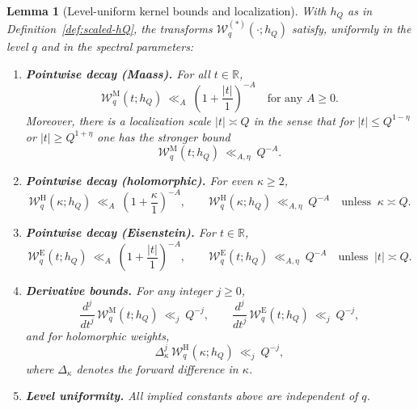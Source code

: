 \documentclass[11pt]{article}
\newtheorem{lemma}{Lemma}[part]
\theoremstyle{definition}
\theoremstyle{remark}
\numberwithin{equation}{part}
\begin{document}
\begin{lemma}[Level-uniform kernel bounds and localization]\label{lem:kuznetsov-uniform}
	With $h_Q$ as in Definition~\ref{def:scaled-hQ}, the transforms $\mathcal W_q^{(*)}(\cdot;h_Q)$ satisfy, uniformly in the level $q$ and in the spectral parameters:
	\begin{enumerate}[label=(\alph*), leftmargin=2em]
		\item \textbf{Pointwise decay (Maass).} For all $t\in\mathbb R$,
		      \[
			      \mathcal W_q^{\mathrm{M}}(t;h_Q)\ \ll_A\ \left(1+\frac{|t|}{1}\right)^{-A}
			      \quad\text{for any }A\ge0.
		      \]
		      Moreover, there is a \emph{localization scale} $|t|\asymp Q$ in the sense that for $|t|\le Q^{1-\eta}$ or $|t|\ge Q^{1+\eta}$ one has the stronger bound
		      \[
			      \mathcal W_q^{\mathrm{M}}(t;h_Q)\ \ll_{A,\eta}\ Q^{-A}.
		      \]
		\item \textbf{Pointwise decay (holomorphic).} For even $\kappa\ge2$,
		      \[
			      \mathcal W_q^{\mathrm{H}}(\kappa;h_Q)\ \ll_A\ \left(1+\frac{\kappa}{1}\right)^{-A},
			      \qquad
			      \mathcal W_q^{\mathrm{H}}(\kappa;h_Q)\ \ll_{A,\eta}\ Q^{-A}\quad\text{unless }\ \kappa\asymp Q.
		      \]
		\item \textbf{Pointwise decay (Eisenstein).} For $t\in\mathbb R$,
		      \[
			      \mathcal W_q^{\mathrm{E}}(t;h_Q)\ \ll_A\ \left(1+\frac{|t|}{1}\right)^{-A},
			      \qquad
			      \mathcal W_q^{\mathrm{E}}(t;h_Q)\ \ll_{A,\eta}\ Q^{-A}\quad\text{unless }\ |t|\asymp Q.
		      \]
		\item \textbf{Derivative bounds.} For any integer $j\ge0$,
		      \[
			      \frac{d^j}{dt^j}\,\mathcal W_q^{\mathrm{M}}(t;h_Q)\ \ll_{j}\ Q^{-j},\qquad
			      \frac{d^j}{dt^j}\,\mathcal W_q^{\mathrm{E}}(t;h_Q)\ \ll_{j}\ Q^{-j},
		      \]
		      and for holomorphic weights,
		      \[
			      \Delta_\kappa^j\,\mathcal W_q^{\mathrm{H}}(\kappa;h_Q)\ \ll_{j}\ Q^{-j},
		      \]
		      where $\Delta_\kappa$ denotes the forward difference in $\kappa$.
		\item \textbf{Level uniformity.} All implied constants above are \emph{independent of $q$}.
	\end{enumerate}
\end{lemma}
\end{document}
